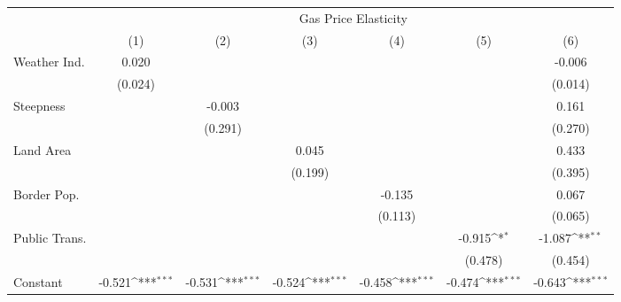 {
\def\sym#1{\ifmmode^{#1}\else\(^{#1}\)\fi}
\begin{tabular}{l*{6}{c}}
\hline\hline
            &\multicolumn{6}{c}{Gas Price Elasticity}                                                                                           \\
            &\multicolumn{1}{c}{(1)}         &\multicolumn{1}{c}{(2)}         &\multicolumn{1}{c}{(3)}         &\multicolumn{1}{c}{(4)}         &\multicolumn{1}{c}{(5)}         &\multicolumn{1}{c}{(6)}         \\
\hline
Weather Ind.&       0.020         &                     &                     &                     &                     &      -0.006         \\
            &     (0.024)         &                     &                     &                     &                     &     (0.014)         \\
[1em]
Steepness   &                     &      -0.003         &                     &                     &                     &       0.161         \\
            &                     &     (0.291)         &                     &                     &                     &     (0.270)         \\
[1em]
Land Area   &                     &                     &       0.045         &                     &                     &       0.433         \\
            &                     &                     &     (0.199)         &                     &                     &     (0.395)         \\
[1em]
Border Pop. &                     &                     &                     &      -0.135         &                     &       0.067         \\
            &                     &                     &                     &     (0.113)         &                     &     (0.065)         \\
[1em]
Public Trans.&                     &                     &                     &                     &      -0.915\sym{*}  &      -1.087\sym{**} \\
            &                     &                     &                     &                     &     (0.478)         &     (0.454)         \\
[1em]
Constant    &      -0.521\sym{***}&      -0.531\sym{***}&      -0.524\sym{***}&      -0.458\sym{***}&      -0.474\sym{***}&      -0.643\sym{***}\\

\end{tabular}}
